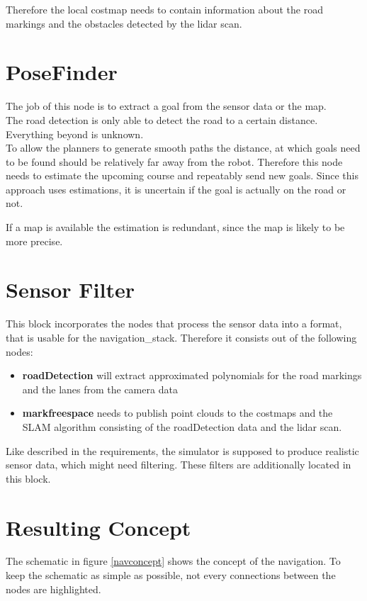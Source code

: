 Therefore the local costmap needs to contain information about the road markings and the obstacles detected by the lidar scan.

\section{PoseFinder}
The job of this node is to extract a goal from the sensor data or the map.\\

The road detection is only able to detect the road to a certain distance. Everything beyond is unknown.\\
To allow the planners to generate smooth paths the distance, at which goals need to be found should be relatively far away from the robot. Therefore this node needs to estimate the upcoming course and repeatably send new goals. Since this approach uses estimations, it is uncertain if the goal is actually on the road or not.

If a map is available the estimation is redundant, since the map is likely to be more precise.

\section{Sensor Filter}

This block incorporates the nodes that process the sensor data into a format, that is usable for the navigation\_stack. 
Therefore it consists out of the following nodes:

\begin{itemize}
	\item \textbf{roadDetection} will extract approximated polynomials for the road markings and the lanes from the camera data
	\item \textbf{markfreespace} needs to publish point clouds to the costmaps and the SLAM algorithm consisting of the roadDetection data and the lidar scan.
\end{itemize}

Like described in the requirements, the simulator is supposed to produce realistic sensor data, which might need filtering. These filters are additionally located in this block.

\section{Resulting Concept}
The schematic in figure \ref{navconcept} shows the concept of the navigation.  To keep the schematic as simple as possible, not every connections between the nodes are highlighted.\\

